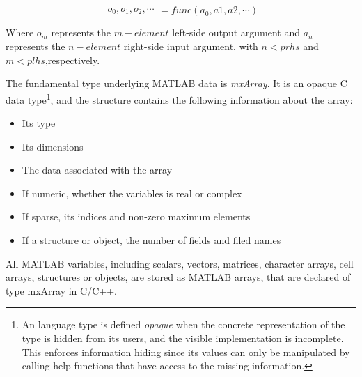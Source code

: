\documentclass[12pt,a4paper]{extarticle}
\newcommand{\linespace}{\vspace{0pt}}
\begin{document}
\[
\begin{matrix}
o_{0},o_{1},o_{2}, \cdots
\end{matrix}
= func (a_{0}, a{1},a{2}, \cdots )
\]

Where $o_{m}$ represents the $m-element$ left-side output argument and $a_{n}$ represents the $n-element$ right-side input argument, with $n < prhs$ and $m < plhs$,respectively.
\linespace

The fundamental type underlying MATLAB data is \textit{mxArray}. It is an opaque C data type\footnote{An language type is defined \textit{opaque} when the concrete representation of the type is hidden from its users, and the visible implementation is incomplete. This enforces information hiding since its values can only be manipulated by calling help functions that have access to the missing information.}, and the structure contains the following information about the array:

\begin{itemize}
\item Its type
\item Its dimensions
\item The data associated with the array
\item If numeric, whether the variables is real or complex
\item If sparse, its indices and non-zero maximum elements
\item If a structure or object, the number of fields and filed names
\end{itemize}
\linespace

All MATLAB variables, including scalars, vectors, matrices, character arrays, cell arrays, structures or objects, are stored as MATLAB arrays, that are declared of type mxArray in C/C++.
\end{document}
